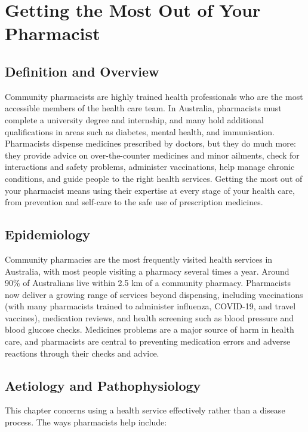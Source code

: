 \chapter{Getting the Most Out of Your Pharmacist}

\section*{Definition and Overview}
Community pharmacists are highly trained health professionals who are the most accessible members of the health care team. In Australia, pharmacists must complete a university degree and internship, and many hold additional qualifications in areas such as diabetes, mental health, and immunisation. Pharmacists dispense medicines prescribed by doctors, but they do much more: they provide advice on over-the-counter medicines and minor ailments, check for interactions and safety problems, administer vaccinations, help manage chronic conditions, and guide people to the right health services. Getting the most out of your pharmacist means using their expertise at every stage of your health care, from prevention and self-care to the safe use of prescription medicines.

\section*{Epidemiology}
Community pharmacies are the most frequently visited health services in Australia, with most people visiting a pharmacy several times a year. Around 90\% of Australians live within 2.5 km of a community pharmacy. Pharmacists now deliver a growing range of services beyond dispensing, including vaccinations (with many pharmacists trained to administer influenza, COVID-19, and travel vaccines), medication reviews, and health screening such as blood pressure and blood glucose checks. Medicines problems are a major source of harm in health care, and pharmacists are central to preventing medication errors and adverse reactions through their checks and advice.

\section*{Aetiology and Pathophysiology}
This chapter concerns using a health service effectively rather than a disease process. The ways pharmacists help include:

